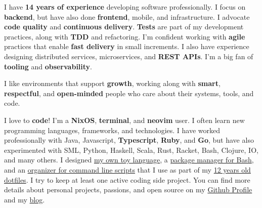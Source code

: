 \documentclass[10pt,a4paper,ragged2e,withhyper]{altacv}
\begin{document}
\begin{paracol}{2}



\switchcolumn

%

%
%
%


I have \textbf{14 years of experience} developing software professionally. I focus on \textbf{backend}, but have also done \textbf{frontend}, mobile, and infrastructure. I advocate \textbf{code quality} and \textbf{continuous delivery}. \textbf{Tests} are part of my development practices, along with \textbf{TDD} and refactoring. I’m confident working with \textbf{agile} practices that enable \textbf{fast delivery} in small increments. I also have experience designing distributed services, microservices, and \textbf{REST APIs}. I'm a big fan of \textbf{tooling} and \textbf{observability}.

\begingroup
\setlength{\parskip}{1em}

I like environments that support \textbf{growth}, working along with \textbf{smart}, \textbf{respectful}, and \textbf{open-minded} people who care about their systems, tools, and code.

I love to \textbf{code}! I'm a \textbf{NixOS}, \textbf{terminal}, and \textbf{neovim} user. I often learn new programming languages, frameworks, and technologies. I have worked professionally with Java, Javascript, \textbf{Typescript}, \textbf{Ruby}, and \textbf{Go}, but have also experimented with SML, Python, Haskell, Scala, Rust, Racket, Bash, Clojure, IO, and many others. I designed \href{https://github.com/juanibiapina/marco}{my own toy language}, a \href{https://github.com/basherpm/basher}{package manager for Bash}, and an \href{https://github.com/juanibiapina/sub}{organizer for command line scripts} that I use as part of my \href{https://github.com/juanibiapina/dotfiles}{12 years old dotfiles}. I try to keep at least one active coding side project. You can find more details about personal projects, passions, and open source on my \href{https://github.com/juanibiapina/}{Github Profile} and my \href{https://juanibiapina.github.io/}{blog}.


\end{paracol}
\end{document}
